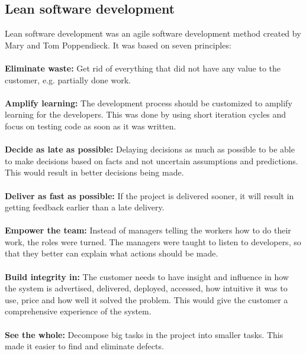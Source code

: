 \subsection{Lean software development}
Lean software development was an agile software development method created by Mary and Tom Poppendieck. It was based on seven principles:\\
\\
\textbf{Eliminate waste:} Get rid of everything that did not have any value to the customer, e.g. partially done work.\\
\\
\textbf{Amplify learning:} The development process should be customized to amplify learning for the developers. This was done by using short iteration cycles and focus on testing code as soon as it was written.\\
\\
\textbf{Decide as late as possible:} Delaying decisions as much as possible to be able to make decisions based on facts and not uncertain assumptions and predictions. This would result in better decisions being made.\\
\\
\textbf{Deliver as fast as possible:} If the project is delivered sooner, it will result in getting feedback earlier than a late delivery.\\
\\
\textbf{Empower the team:} Instead of managers telling the workers how to do their work, the roles were turned. The managers were taught to listen to developers, so that they better can explain what actions should be made.\\
\\
\textbf{Build integrity in:} The customer needs to have insight and influence in how the system is advertised, delivered, deployed, accessed, how intuitive it was to use, price and how well it solved the problem. This would give the customer a comprehensive experience of the system.\\
\\
\textbf{See the whole:} Decompose big tasks in the project into smaller tasks. This made it easier to find and eliminate defects.

